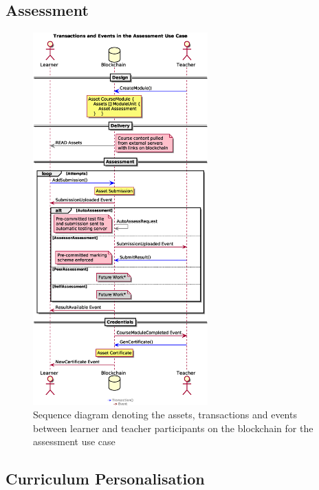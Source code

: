 \subsection{Assessment}



\begin{figure}[!ht] 
    \centering    
    \includegraphics[width=0.6\textwidth]{assessmentloop}
    \caption[Assessment Use Case]
        {Sequence diagram denoting the assets, transactions and events between 
        learner and teacher participants on the blockchain for the assessment use case} 
    \label{fig:assessmentloop}
\end{figure}


\subsection{Curriculum Personalisation}

